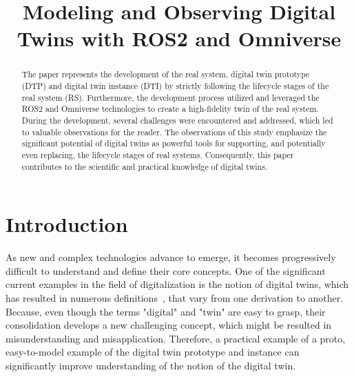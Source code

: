 \documentclass[conference]{IEEEtran}
\begin{document}
    \title{Modeling and Observing Digital Twins with ROS2 and Omniverse}
    \author{ 
    }
    
    \maketitle

    \begin{abstract}
        The paper represents the development of the real system, digital twin prototype (DTP) and digital twin instance (DTI) by strictly following the lifecycle stages of the real system (RS).  
        Furthermore, the development process utilized and leveraged the ROS2 and Omniverse technologies to create a high-fidelity twin of the real system. During the development, several challenges were encountered and addressed, which led to
        valuable observations for the reader. The observations of this study emphasize the significant potential of digital twins as powerful tools for supporting, and potentially even replacing,
        the lifecycle stages of real systems. Consequently, this paper contributes to the scientific and practical knowledge of digital twins. 
    \end{abstract}

    \section{Introduction}\label{section:introduction}
    As new and complex technologies advance to emerge, it becomes progressively difficult to understand and define their core concepts.
    One of the significant current examples in the field of digitalization is the notion of digital twins, which has resulted in numerous definitions~\cite{Review1}, 
    that vary from one derivation to another. Because, even though the terms "digital" and "twin" are easy to grasp, their consolidation develops a new challenging concept, 
    which might be resulted in misunderstanding and misapplication. Therefore, a practical example of a proto, easy-to-model example of the digital twin prototype and instance 
    can significantly improve understanding of the notion of the digital twin.
    
\end{document}

